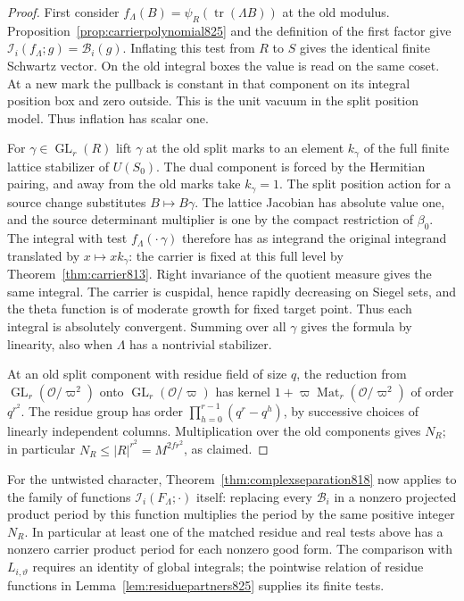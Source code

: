 \documentclass[a4paper,11pt]{article}
\theoremstyle{definition}
\theoremstyle{remark}
\numberwithin{equation}{section}
\newcommand{\OO}{\mathcal O}
\begin{document}
\begin{proof}
First consider \(f_\Lambda(B)=
\psi_R(\operatorname{tr}(\Lambda B))\) at the old modulus.
Proposition~\ref{prop:carrierpolynomial825} and the definition
of the first factor give
\(\mathcal I_i(f_\Lambda;g)=\mathcal B_i(g)\).
Inflating this test from \(R\) to \(S\) gives the identical
finite Schwartz vector. On the old integral boxes the value
is read on the same coset. At a new mark the pullback is
constant in that component on its integral position box and
zero outside. This is the unit vacuum in the split position
model. Thus inflation has scalar one.

For \(\gamma\in\operatorname{GL}_{r}(R)\) lift \(\gamma\)
at the old split marks to an element \(k_\gamma\) of the full
finite lattice stabilizer of \(U(S_0)\). The dual component
is forced by the Hermitian pairing, and away from the old
marks take \(k_\gamma=1\). The split position action for a
source change substitutes \(B\mapsto B\gamma\). The lattice
Jacobian has absolute value one, and the source determinant
multiplier is one by the compact restriction of \(\beta_0\).
The integral with test \(f_\Lambda(\cdot\,\gamma)\) therefore
has as integrand the original integrand translated by
\(x\mapsto xk_\gamma\): the carrier is fixed at this full
level by Theorem~\ref{thm:carrier813}. Right invariance of
the quotient measure gives the same integral. The carrier
is cuspidal, hence rapidly decreasing on Siegel sets, and
the theta function is of moderate growth for fixed target
point. Thus each integral is absolutely convergent.
Summing over all \(\gamma\) gives the formula by linearity,
also when \(\Lambda\) has a nontrivial stabilizer.

At an old split component with residue field of size \(q\),
the reduction from \(\operatorname{GL}_r(\OO/\varpi^2)\)
onto \(\operatorname{GL}_r(\OO/\varpi)\) has kernel
\(1+\varpi\operatorname{Mat}_r(\OO/\varpi^2)\) of order
\(q^{r^2}\). The residue group has order
\(\prod_{h=0}^{r-1}(q^r-q^h)\), by successive choices of
linearly independent columns. Multiplication over the old
components gives \(N_R\); in particular
\(N_R\le |R|^{r^2}=M^{2fr^2}\), as claimed.
\end{proof}

For the untwisted character, Theorem~\ref{thm:complexseparation818}
now applies to the family of functions
\(\mathcal I_i(F_\Lambda;\cdot)\) itself: replacing every
\(\mathcal B_i\) in a nonzero projected product period by this
function multiplies the period by the same positive integer
\(N_R\). In particular at least one of the matched residue and
real tests above has a nonzero carrier product period for each
nonzero good form. The comparison with
\(L_{i,\vartheta}\) requires an identity of global integrals;
the pointwise relation of residue functions in
Lemma~\ref{lem:residuepartners825} supplies its finite tests.
\clearpage
\end{document}
